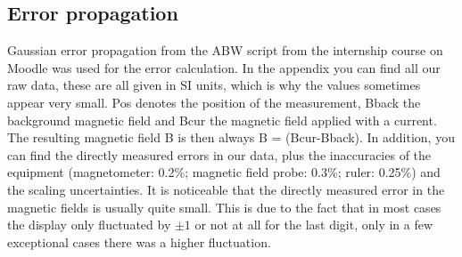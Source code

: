 \documentclass[12pt]{article}
\begin{document}
	\subsection{Error propagation}
	
	Gaussian error propagation from the ABW script from the internship course on Moodle was used for the error calculation. In the appendix you can find all our raw data, these are all given in SI units, which is why the values sometimes appear very small. Pos denotes the position of the measurement, Bback the background magnetic field and Bcur the magnetic field applied with a current. The resulting magnetic field B is then always B = (Bcur-Bback). In addition, you can find the directly measured errors in our data, plus the inaccuracies of the equipment (magnetometer: 0.2\%; magnetic field probe: 0.3\%; ruler: 0.25\%) and the scaling uncertainties. It is noticeable that the directly measured error in the magnetic fields is usually quite small. This is due to the fact that in most cases the display only fluctuated by $ \pm 1 $ or not at all for the last digit, only in a few exceptional cases there was a higher fluctuation.
	
	
		
		
	
	
\end{document}
